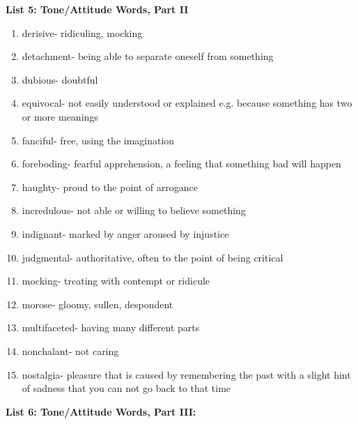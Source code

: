 \textbf{List 5: Tone/Attitude Words, Part II}

\begin{enumerate}
\item derisive- ridiculing, mocking
\item detachment- being able to separate oneself from something
\item dubious- doubtful
\item equivocal- not easily understood or explained e.g. because something has two or more meanings
\item fanciful- free, using the imagination
\item foreboding- fearful apprehension, a feeling that something bad will happen
\item haughty- proud to the point of arrogance
\item incredulous- not able or willing to believe something
\item indignant- marked by anger aroused by injustice
\item judgmental- authoritative, often to the point of being critical
\item mocking- treating with contempt or ridicule
\item morose- gloomy, sullen, despondent
\item multifaceted- having many different parts
\item nonchalant- not caring
\item nostalgia-  pleasure that is caused by remembering the past with a slight hint of sadness that you can not go back to that time
\end{enumerate}

\textbf{List 6: Tone/Attitude Words, Part III:}

